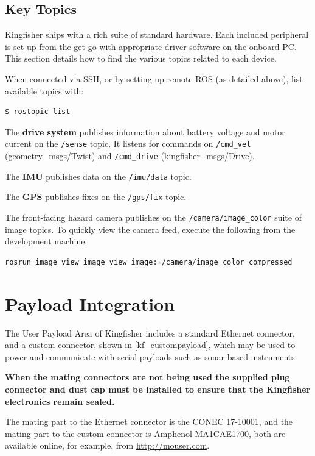\documentclass[]{clearpath-latex/clearpath-manual}
\begin{document}
\pagebreak

\subsection{Key Topics}
Kingfisher ships with a rich suite of standard hardware. Each included peripheral is set up from the get-go with appropriate driver software on the onboard PC. This section details how to find the various topics related to each device.

When connected via SSH, or by setting up remote ROS (as detailed above), list available topics with:

\begin{lstlisting}
$ rostopic list
\end{lstlisting}

The \textbf{drive system} publishes information about battery voltage and motor current on the \lstinline{/sense} topic. It listens for commands on \lstinline{/cmd_vel} (geometry\_msgs/Twist) and \lstinline{/cmd_drive} (kingfisher\_msgs/Drive).

The \textbf{IMU} publishes data on the \lstinline{/imu/data} topic.

The \textbf{GPS} publishes fixes on the \lstinline{/gps/fix} topic.

The front-facing hazard camera publishes on the \lstinline{/camera/image_color} suite of image topics. To quickly view the camera feed, execute the following from the development machine: 

\begin{lstlisting}
rosrun image_view image_view image:=/camera/image_color compressed
\end{lstlisting}

\newpage

\section{Payload Integration}
The User Payload Area of Kingfisher includes a standard Ethernet connector, and a custom connector, shown in \autoref{kf_custompayload}, which may be used to power and communicate with serial payloads such as sonar-based instruments.

\textbf{When the mating connectors are not being used the supplied plug connector and dust cap must be installed to ensure that the Kingfisher electronics remain sealed.}

The mating part to the Ethernet connector is the CONEC 17-10001, and the mating part to the custom connector is Amphenol MA1CAE1700, both are available online, for example, from \url{http://mouser.com}.
\end{document}
